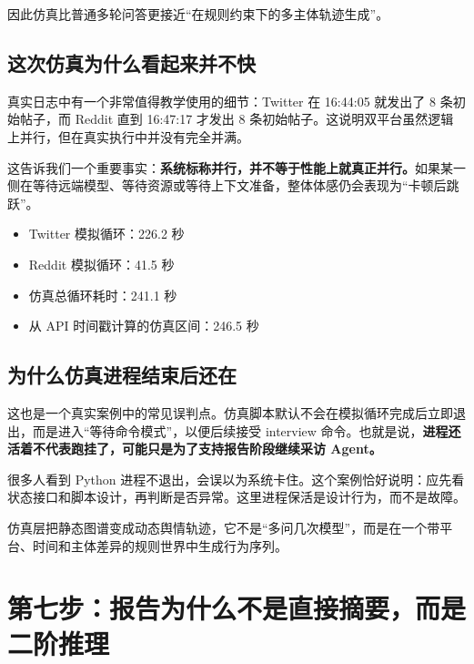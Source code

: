 \documentclass[UTF8,10pt,oneside]{ctexbook}
\begin{document}
因此仿真比普通多轮问答更接近“在规则约束下的多主体轨迹生成”。

\section{这次仿真为什么看起来并不快}

真实日志中有一个非常值得教学使用的细节：Twitter 在 16:44:05 就发出了 8 条初始帖子，而 Reddit 直到 16:47:17 才发出 8 条初始帖子。这说明双平台虽然逻辑上并行，但在真实执行中并没有完全并满。

这告诉我们一个重要事实：\textbf{系统标称并行，并不等于性能上就真正并行。}如果某一侧在等待远端模型、等待资源或等待上下文准备，整体体感仍会表现为“卡顿后跳跃”。

\begin{casebox}[本次仿真的真实耗时]
\begin{itemize}
  \item Twitter 模拟循环：226.2 秒
  \item Reddit 模拟循环：41.5 秒
  \item 仿真总循环耗时：241.1 秒
  \item 从 API 时间戳计算的仿真区间：246.5 秒
\end{itemize}
\end{casebox}

\section{为什么仿真进程结束后还在}

这也是一个真实案例中的常见误判点。仿真脚本默认不会在模拟循环完成后立即退出，而是进入“等待命令模式”，以便后续接受 interview 命令。也就是说，\textbf{进程还活着不代表跑挂了，可能只是为了支持报告阶段继续采访 Agent。}

\begin{warningbox}[教学提醒]
很多人看到 Python 进程不退出，会误以为系统卡住。这个案例恰好说明：应先看状态接口和脚本设计，再判断是否异常。这里进程保活是设计行为，而不是故障。
\end{warningbox}

\begin{takeawaybox}[本章核心结论]
仿真层把静态图谱变成动态舆情轨迹，它不是“多问几次模型”，而是在一个带平台、时间和主体差异的规则世界中生成行为序列。
\end{takeawaybox}

\chapter{第七步：报告为什么不是直接摘要，而是二阶推理}
\end{document}
